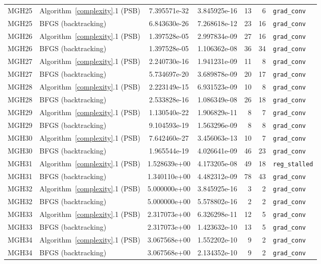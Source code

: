 \documentclass{article}
\begin{document}
{\begin{longtable}{l l S[table-format=1.3e2] S[table-format=1.3e2] r r >{\raggedright\arraybackslash}p{2.2cm}}
		\midrule
		MGH25 & Algorithm~\ref{complexity}.1 (PSB) & 7.395571e-32 & 3.845925e-16 & 13 & 6 & \texttt{grad\_conv} \\
		MGH25 & BFGS (backtracking) & 6.843630e-26 & 7.268618e-12 & 23 & 16 & \texttt{grad\_conv} \\
		\midrule
		MGH26 & Algorithm~\ref{complexity}.1 (PSB) & 1.397528e-05 & 2.997834e-09 & 27 & 16 & \texttt{grad\_conv} \\
		MGH26 & BFGS (backtracking) & 1.397528e-05 & 1.106362e-08 & 36 & 34 & \texttt{grad\_conv} \\
		\midrule
		MGH27 & Algorithm~\ref{complexity}.1 (PSB) & 2.240730e-16 & 1.941231e-09 & 11 & 8 & \texttt{grad\_conv} \\
		MGH27 & BFGS (backtracking) & 5.734697e-20 & 3.689878e-09 & 20 & 17 & \texttt{grad\_conv} \\
		\midrule
		MGH28 & Algorithm~\ref{complexity}.1 (PSB) & 2.223149e-15 & 6.931523e-09 & 10 & 8 & \texttt{grad\_conv} \\
		MGH28 & BFGS (backtracking) & 2.533828e-16 & 1.086349e-08 & 26 & 18 & \texttt{grad\_conv} \\
		\midrule
		MGH29 & Algorithm~\ref{complexity}.1 (PSB) & 1.130540e-22 & 1.906829e-11 & 8 & 7 & \texttt{grad\_conv} \\
		MGH29 & BFGS (backtracking) & 9.104593e-19 & 1.563296e-09 & 8 & 8 & \texttt{grad\_conv} \\
		\midrule
		MGH30 & Algorithm~\ref{complexity}.1 (PSB) & 7.642460e-27 & 3.456063e-13 & 10 & 7 & \texttt{grad\_conv} \\
		MGH30 & BFGS (backtracking) & 1.965544e-19 & 4.026641e-09 & 46 & 23 & \texttt{grad\_conv} \\
		\midrule
		MGH31 & Algorithm~\ref{complexity}.1 (PSB) & 1.528639e+00 & 4.173205e-08 & 49 & 18 & \texttt{reg\_stalled} \\
		MGH31 & BFGS (backtracking) & 1.340110e+00 & 4.482312e-09 & 78 & 43 & \texttt{grad\_conv} \\
		\midrule
		MGH32 & Algorithm~\ref{complexity}.1 (PSB) & 5.000000e+00 & 3.845925e-16 & 3 & 2 & \texttt{grad\_conv} \\
		MGH32 & BFGS (backtracking) & 5.000000e+00 & 5.578802e-16 & 2 & 2 & \texttt{grad\_conv} \\
		\midrule
		MGH33 & Algorithm~\ref{complexity}.1 (PSB) & 2.317073e+00 & 6.326298e-11 & 12 & 5 & \texttt{grad\_conv} \\
		MGH33 & BFGS (backtracking) & 2.317073e+00 & 1.423632e-10 & 13 & 5 & \texttt{grad\_conv} \\
		\midrule
		MGH34 & Algorithm~\ref{complexity}.1 (PSB) & 3.067568e+00 & 1.552202e-10 & 9 & 2 & \texttt{grad\_conv} \\
		MGH34 & BFGS (backtracking) & 3.067568e+00 & 2.134352e-10 & 9 & 2 & \texttt{grad\_conv} \\
\end{longtable}}
\FloatBarrier
\end{document}

